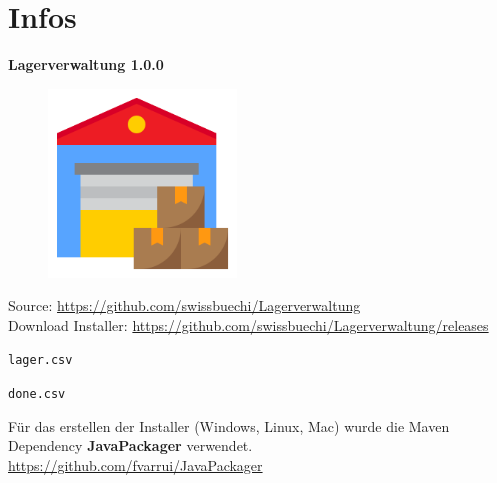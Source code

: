 \chapter{Infos}

\textbf{Lagerverwaltung 1.0.0}

\begin{figure}[h!]
    \includegraphics[width=5cm]{../src/main/resources/images/logo.png}
\end{figure}

Source: \url{https://github.com/swissbuechi/Lagerverwaltung} \\
Download Installer: \url{https://github.com/swissbuechi/Lagerverwaltung/releases}

\verb|lager.csv|



\verb|done.csv|



Für das erstellen der Installer (Windows, Linux, Mac) wurde die Maven Dependency \textbf{JavaPackager} verwendet. \\
\url{https://github.com/fvarrui/JavaPackager}